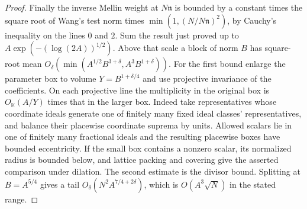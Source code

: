 \documentclass[11pt,letterpaper]{article}
\theoremstyle{definition}
\numberwithin{equation}{section}
\begin{document}
\begin{proof}
Finally the inverse Mellin weight at $N\mathfrak n$ is bounded
by a constant times the square root of Wang's test norm times
$\min(1,(N/N\mathfrak n)^2)$, by Cauchy's inequality on the
lines $0$ and $2$. Sum the result just proved up to
$A\exp(-(\log(2A))^{1/2})$. Above that scale a block of norm $B$
has square-root mean $O_\delta(\min(A^{1/2}B^{3+\delta},
A^3 B^{1+\delta}))$. For the first bound enlarge the parameter box
to volume $Y=B^{1+\delta/4}$ and use projective invariance of the
coefficients. On each projective line the multiplicity in the
original box is $O_{\mathbb K}(A/Y)$ times that in the larger box.
Indeed take representatives whose coordinate ideals generate one
of finitely many fixed ideal classes' representatives, and balance
their placewise coordinate suprema by units. Allowed scalars lie
in one of finitely many fractional ideals and the resulting
placewise boxes have bounded eccentricity. If the small box
contains a nonzero scalar, its normalized radius is bounded below,
and lattice packing and covering give the asserted comparison
under dilation. The second estimate is the divisor bound.
Splitting at $B=A^{5/4}$ gives a tail
$O_\delta(N^2 A^{7/4+2\delta})$, which is
$O(A^3\sqrt N)$ in the stated range.
\end{proof}
\end{document}
